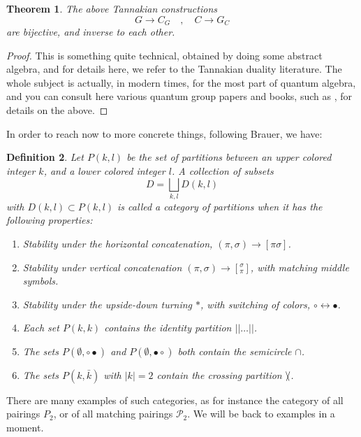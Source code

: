 \documentclass[12pt]{amsbook}
\newtheorem{theorem}{Theorem}[chapter]
\newtheorem{definition}[theorem]{Definition}
\begin{document}
\begin{theorem}
The above Tannakian constructions 
$$G\to C_G\quad,\quad 
C\to G_C$$
are bijective, and inverse to each other.
\end{theorem}

\begin{proof}
This is something quite technical, obtained by doing some abstract algebra, and for details here, we refer to the Tannakian duality literature. The whole subject is actually, in modern times, for the most part of quantum algebra, and you can consult here various quantum group papers and books, such as \cite{ba2}, for details on the above.
\end{proof}

In order to reach now to more concrete things, following Brauer, we have:


\begin{definition}
Let $P(k,l)$ be the set of partitions between an upper colored integer $k$, and a lower colored integer $l$. A collection of subsets 
$$D=\bigsqcup_{k,l}D(k,l)$$
with $D(k,l)\subset P(k,l)$ is called a category of partitions when it has the following properties:
\begin{enumerate}
\item Stability under the horizontal concatenation, $(\pi,\sigma)\to[\pi\sigma]$.

\item Stability under vertical concatenation $(\pi,\sigma)\to[^\sigma_\pi]$, with matching middle symbols.

\item Stability under the upside-down turning $*$, with switching of colors, $\circ\leftrightarrow\bullet$.

\item Each set $P(k,k)$ contains the identity partition $||\ldots||$.

\item The sets $P(\emptyset,\circ\bullet)$ and $P(\emptyset,\bullet\circ)$ both contain the semicircle $\cap$.

\item The sets $P(k,\bar{k})$ with $|k|=2$ contain the crossing partition $\slash\hskip-2.0mm\backslash$.
\end{enumerate}
\end{definition} 

There are many examples of such categories, as for instance the category of all pairings $P_2$, or of all matching pairings $\mathcal P_2$. We will be back to examples in a moment.
\end{document}
